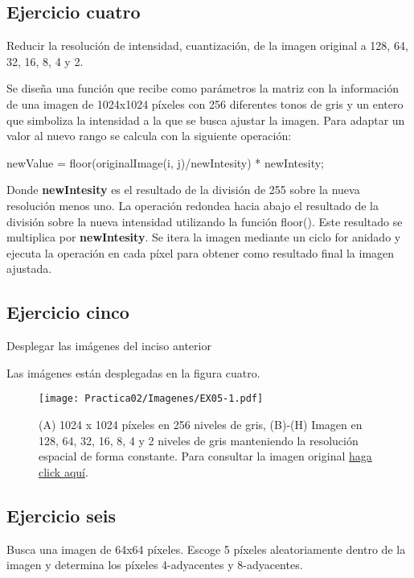 \documentclass[
  journal=largetwo,
  manuscript=Practica-Dos,
  year=2024-1, %
  volume=37,
  spanish, %
]{cup-journal}
\begin{document}
\subsection{Ejercicio cuatro}

Reducir la resolución de intensidad, cuantización, de la imagen original a 128, 64, 32, 16, 8, 4 y 2.

Se diseña una función que recibe como parámetros la matriz con la información de una imagen de 1024x1024 píxeles con 256 diferentes tonos de gris y un entero que simboliza la intensidad a la que se busca ajustar la imagen. Para adaptar un valor al nuevo rango se calcula con la siguiente operación: 
\begin{center}
    newValue = floor(originalImage(i, j)/newIntesity) * newIntesity;
\end{center}
Donde \textbf{newIntesity} es el resultado de la división de 255 sobre la nueva resolución menos uno. La operación redondea hacia abajo el resultado de la división sobre la nueva intensidad utilizando la función floor(). Este resultado se multiplica por \textbf{newIntesity}. Se itera la imagen mediante un ciclo for anidado y ejecuta la operación en cada píxel para obtener como resultado final la imagen ajustada.


\subsection{Ejercicio cinco}

Desplegar las imágenes del inciso anterior

Las imágenes están desplegadas en la figura cuatro.

\begin{figure}[hbt!]
\centering
\texttt{[image: Practica02/Imagenes/EX05-1.pdf]}
\caption{(A) 1024 x 1024 píxeles en 256 niveles de gris, (B)-(H) Imagen en 128, 64, 32, 16, 8, 4 y 2 niveles de gris manteniendo la resolución espacial de forma constante. Para consultar la imagen original  \href{https://drive.google.com/file/d/1c37LTU-y8kE3kEiZ6SsUdeXmGB3KVb_8/view?usp=sharing
}{haga click aquí}.}
\label{fig_sim}
\end{figure}




\subsection{Ejercicio seis}

Busca una imagen de 64x64 píxeles. Escoge 5 píxeles aleatoriamente dentro de la imagen y determina los píxeles 4-adyacentes y 8-adyacentes.
\end{document}
